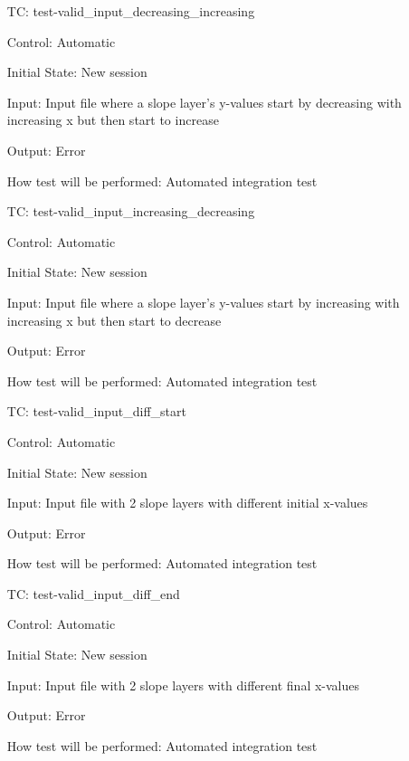 \documentclass[12pt, titlepage]{article}
\newcounter{testnum} %
\begin{document}
\begin{enumerate}[label=TC\arabic*:,ref={\arabic*}]
	
	\item [TC\refstepcounter{testnum}\thetestnum: \label{TC_InvalidInDecInc}] 
	test-valid\_input\_decreasing\_increasing
	
	Control: Automatic
	
	Initial State: New session
	
	Input: Input file where a slope layer's y-values start by decreasing with 
	increasing x but then start to increase
	
	Output: Error
	
	How test will be performed: Automated integration test
	
	\item [TC\refstepcounter{testnum}\thetestnum: \label{TC_InvalidInIncDec}] 
	test-valid\_input\_increasing\_decreasing
	
	Control: Automatic
	
	Initial State: New session
	
	Input: Input file where a slope layer's y-values start by increasing with 
	increasing x but then start to decrease
	
	Output: Error
	
	How test will be performed: Automated integration test
	
	\item [TC\refstepcounter{testnum}\thetestnum: 
	\label{TC_InvalidInDiffStart}] 
	test-valid\_input\_diff\_start
	
	Control: Automatic
	
	Initial State: New session
	
	Input: Input file with 2 slope layers with different initial x-values
	
	Output: Error
	
	How test will be performed: Automated integration test
	
	\item [TC\refstepcounter{testnum}\thetestnum: \label{TC_InvalidInDiffEnd}] 
	test-valid\_input\_diff\_end
	
	Control: Automatic
	
	Initial State: New session
	
	Input: Input file with 2 slope layers with different final x-values
	
	Output: Error
	
	How test will be performed: Automated integration test
	

\end{enumerate}
\end{document}
